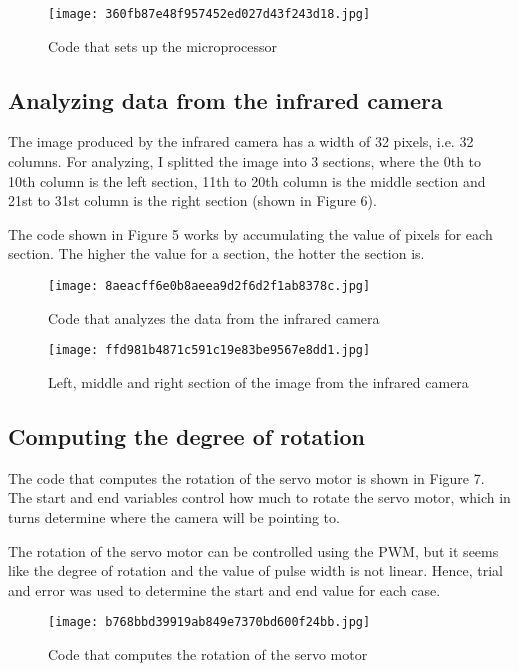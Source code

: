 \documentclass[12pt]{article}
\begin{document}
\begin{figure}[h]
\texttt{[image: 360fb87e48f957452ed027d43f243d18.jpg]}
\centering
\caption{Code that sets up the microprocessor}
\end{figure}
\pagebreak

\subsection {Analyzing data from the infrared camera}

The image produced by the infrared camera has a width of 32 pixels, i.e. 32 columns. For analyzing, I splitted the image into 3 sections, where the 0th to 10th column is the left section, 11th to 20th column is the middle section and 21st to 31st column is the right section (shown in Figure 6).

The code shown in Figure 5 works by accumulating the value of pixels for each section. The higher the value for a section, the hotter the section is.

\begin{figure}[h]
\texttt{[image: 8aeacff6e0b8aeea9d2f6d2f1ab8378c.jpg]}
\centering
\caption{Code that analyzes the data from the infrared camera}
\end{figure}

\begin{figure}[h]
\texttt{[image: ffd981b4871c591c19e83be9567e8dd1.jpg]}
\centering
\caption{Left, middle and right section of the image from the infrared camera}
\end{figure}
\pagebreak

\subsection {Computing the degree of rotation}

The code that computes the rotation of the servo motor is shown in Figure 7. The start and end variables control how much to rotate the servo motor, which in turns determine where the camera will be pointing to.

The rotation of the servo motor can be controlled using the PWM, but it seems like the degree of rotation and the value of pulse width is not linear. Hence, trial and error was used to determine the start and end value for each case.
\pagebreak

\begin{figure}[h]
\texttt{[image: b768bbd39919ab849e7370bd600f24bb.jpg]}
\centering
\caption{Code that computes the rotation of the servo motor}
\end{figure}
\end{document}
